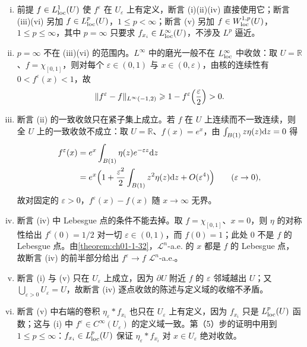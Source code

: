 \documentclass[../../main.tex]{subfiles}%
\begin{document}
\begin{remark}\label{remark:ch04-thm-4-1-条件}
\begin{enumerate}[(i)]
\item 前提 $f\in L^1_{\mathrm{loc}}(U)$ 使 $f^\varepsilon$ 在 $U_\varepsilon$ 上有定义，断言 (i)(ii)(iv) 直接使用它；断言 (iii)(vi) 另加 $f\in L^p_{\mathrm{loc}}(U)$，$1\leqslant p<\infty$；断言 (v) 另加 $f\in W^{1,p}_{\mathrm{loc}}(U)$，$1\leqslant p\leqslant\infty$，其中 $p=\infty$ 只要求 $f_{x_i}\in L^\infty_{\mathrm{loc}}(U)$，不涉及 $L^p$ 逼近。
\item $p=\infty$ 不在 (iii)(vi) 的范围内。$L^\infty$ 中的磨光一般不在 $L^\infty_{\mathrm{loc}}$ 中收敛：取 $U=\mathbb{R}$、$f=\chi_{[0,1]}$，则对每个 $\varepsilon\in(0,1)$ 与 $x\in(0,\varepsilon)$，由核的连续性有 $0<f^\varepsilon(x)<1$，故
\begin{align*}
\lVert f^\varepsilon-f\rVert_{L^\infty(-1,2)}\geqslant1-f^\varepsilon\Bigl(\frac{\varepsilon}{2}\Bigr)>0 .
\end{align*}
\item 断言 (ii) 的一致收敛只在紧子集上成立。若 $f$ 在 $U$ 上连续而不一致连续，则全 $U$ 上的一致收敛不成立：取 $U=\mathbb{R}$、$f(x)=e^x$，由 $\int_{B(1)}z\eta(z)\mathrm{d} z=0$ 得
\begin{align*}
f^\varepsilon(x)&=e^x\int_{B(1)}\eta(z)e^{-\varepsilon z}\mathrm{d} z\\
&=e^x\Bigl(1+\frac{\varepsilon^2}{2}\int_{B(1)}z^2\eta(z)\mathrm{d} z+O(\varepsilon^4)\Bigr)\qquad(\varepsilon\to0),
\end{align*}
故对固定的 $\varepsilon>0$，$f^\varepsilon(x)-f(x)$ 随 $x\to\infty$ 无界。
\item 断言 (iv) 中 Lebesgue 点的条件不能去掉。取 $f=\chi_{[0,1]}$、$x=0$，则 $\eta$ 的对称性给出 $f^\varepsilon(0)=1/2$ 对一切 $\varepsilon\in(0,1)$，而 $f(0)=1$；此处 $0$ 不是 $f$ 的 Lebesgue 点。由\cref{theorem:ch01-1-32}，$\mathcal{L}^n$-a.e. 的 $x$ 都是 $f$ 的 Lebesgue 点，故断言 (iv) 的前半部分给出 $f^\varepsilon\to f$ $\mathcal{L}^n$-a.e.。%
\item 断言 (i) 与 (v) 只在 $U_\varepsilon$ 上成立，因为 $\partial U$ 附近 $f$ 的 $\varepsilon$ 邻域越出 $U$；又 $\bigcup_{\varepsilon>0}U_\varepsilon=U$，故断言 (iv) 逐点收敛的陈述与定义域的收缩不矛盾。
\item 断言 (v) 中右端的卷积 $\eta_\varepsilon*f_{x_i}$ 也只在 $U_\varepsilon$ 上有定义，因为 $f_{x_i}$ 只是 $L^p_{\mathrm{loc}}(U)$ 函数；这与 (i) 中 $f^\varepsilon\in C^\infty(U_\varepsilon)$ 的定义域一致。第（5）步的证明中用到 $1\leqslant p\leqslant\infty$：$f_{x_i}\in L^p_{\mathrm{loc}}(U)$ 保证 $\eta_\varepsilon*f_{x_i}$ 对 $x\in U_\varepsilon$ 绝对收敛。
\end{enumerate}
\end{remark}
\end{document}
